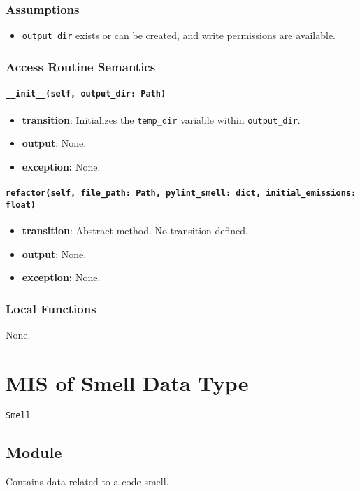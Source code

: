 \documentclass[12pt, titlepage]{article}
\begin{document}
\subsubsection{Assumptions}
\begin{itemize}
  \item \texttt{output\_dir} exists or can be created, and write permissions are available.
\end{itemize}

\subsubsection{Access Routine Semantics}

\paragraph{\texttt{\_\_init\_\_(self, output\_dir: Path)}}
\begin{itemize}
  \item \textbf{transition}: Initializes the \texttt{temp\_dir} variable within \texttt{output\_dir}.
  \item \textbf{output}: None.
  \item \textbf{exception:} None.
\end{itemize}

\paragraph{\texttt{refactor(self, file\_path: Path, pylint\_smell: dict, initial\_emissions: float)}}
\begin{itemize}
  \item \textbf{transition}: Abstract method. No transition defined.
  \item \textbf{output}: None.
  \item \textbf{exception:} None.
\end{itemize}

\subsubsection{Local Functions}
None.

\newpage

\section{MIS of Smell Data Type} \label{mis:smell}
\texttt{Smell}

\subsection{Module}
Contains data related to a code smell.
\end{document}
